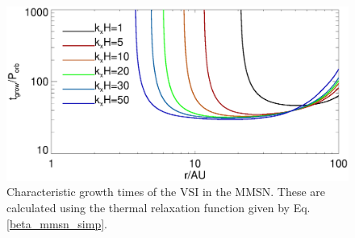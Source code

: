 \begin{figure}
  \includegraphics[width=\linewidth]{figures/eigen_compare_grow.ps}
  \caption{Characteristic growth times of the VSI in 
    the MMSN. These are calculated using the thermal relaxation
    function given by Eq. \ref{beta_mmsn_simp}. 
    \label{mmsn_overall}}    
\end{figure}
